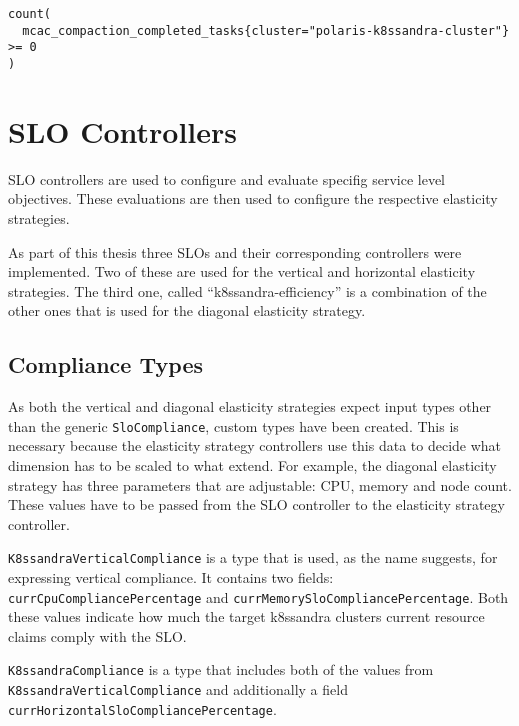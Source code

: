\begin{lstlisting}[caption={PromQL query used to get the amount of nodes in the k8ssandra cluster},
                    captionpos=b,
                    label=lst:getNodeCount,
                    float]
count(
  mcac_compaction_completed_tasks{cluster="polaris-k8ssandra-cluster"} >= 0
)
\end{lstlisting}

\section{SLO Controllers}
\label{sec:slos}

SLO controllers are used to configure and evaluate specifig service level objectives. These evaluations are then used to configure the respective elasticity strategies.

As part of this thesis three SLOs and their corresponding controllers were implemented. Two of these are used for the vertical and horizontal elasticity strategies. The third one, called ``k8ssandra-efficiency'' is a combination of the other ones that is used for the diagonal elasticity strategy.

\subsection{Compliance Types}
\label{sec:compliance-types}

As both the vertical and diagonal elasticity strategies expect input types other than the generic \texttt{SloCompliance}, custom types have been created. This is necessary because the elasticity strategy controllers use this data to decide what dimension has to be scaled to what extend. For example, the diagonal elasticity strategy has three parameters that are adjustable: CPU, memory and node count. These values have to be passed from the SLO controller to the elasticity strategy controller.

\texttt{K8ssandraVerticalCompliance} is a type that is used, as the name suggests, for expressing vertical compliance. It contains two fields: \texttt{currCpuCompliancePercentage} and \texttt{currMemorySloCompliancePercentage}. Both these values indicate how much the target k8ssandra clusters current resource claims comply with the SLO.

\texttt{K8ssandraCompliance} is a type that includes both of the values from \texttt{K8ssandra\-Vertical\-Compliance} and additionally a field \texttt{curr\-Horizontal\-Slo\-Compliance\-Percentage}.

